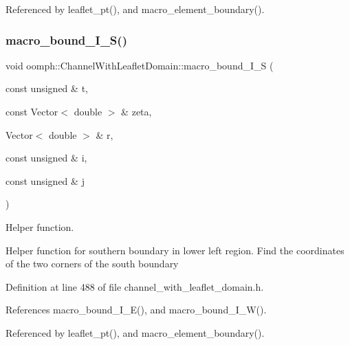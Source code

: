 Referenced by leaflet\+\_\+pt(), and macro\+\_\+element\+\_\+boundary().

\mbox{\label{classoomph_1_1ChannelWithLeafletDomain_a20898c8b6747cf01e3e92e4a5c6ff5e4}} 
\subsubsection{\texorpdfstring{macro\+\_\+bound\+\_\+\+I\+\_\+\+S()}{macro\_bound\_I\_S()}}
{\footnotesize\ttfamily void oomph\+::\+Channel\+With\+Leaflet\+Domain\+::macro\+\_\+bound\+\_\+\+I\+\_\+S (\begin{DoxyParamCaption}\item[{const unsigned \&}]{t,  }\item[{const Vector$<$ double $>$ \&}]{zeta,  }\item[{Vector$<$ double $>$ \&}]{r,  }\item[{const unsigned \&}]{i,  }\item[{const unsigned \&}]{j }\end{DoxyParamCaption})\hspace{0.3cm}{\ttfamily [protected]}}



Helper function. 

Helper function for southern boundary in lower left region. Find the coordinates of the two corners of the south boundary 

Definition at line 488 of file channel\+\_\+with\+\_\+leaflet\+\_\+domain.\+h.



References macro\+\_\+bound\+\_\+\+I\+\_\+\+E(), and macro\+\_\+bound\+\_\+\+I\+\_\+\+W().



Referenced by leaflet\+\_\+pt(), and macro\+\_\+element\+\_\+boundary().

\mbox{\label{classoomph_1_1ChannelWithLeafletDomain_a15e43fe342a04c8466a43112e3a48ff3}} 

